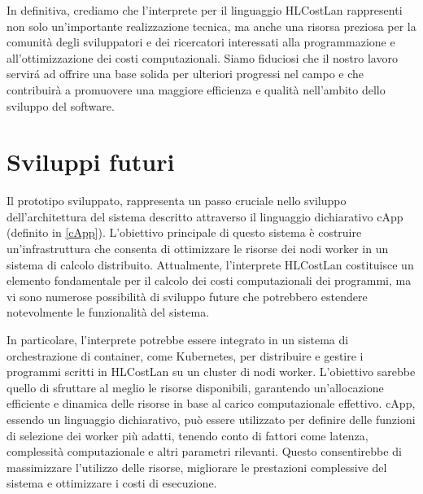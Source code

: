 \documentclass[../../main.tex]{subfiles}
\begin{document}
In definitiva, crediamo che l'interprete per il linguaggio HLCostLan rappresenti non solo un'importante realizzazione tecnica, ma anche una risorsa preziosa per la comunità degli sviluppatori e dei ricercatori interessati alla programmazione e all'ottimizzazione dei costi computazionali. Siamo fiduciosi che il nostro lavoro servirá ad offrire una base solida per ulteriori progressi nel campo e che contribuirà a promuovere una maggiore efficienza e qualità nell'ambito dello sviluppo del software.

\section{Sviluppi futuri}
Il prototipo sviluppato, rappresenta un passo cruciale nello sviluppo dell'architettura del sistema descritto attraverso il linguaggio dichiarativo cApp (definito in \ref{cApp}). L'obiettivo principale di questo sistema è costruire un'infrastruttura che consenta di ottimizzare le risorse dei nodi worker in un sistema di calcolo distribuito. Attualmente, l'interprete HLCostLan costituisce un elemento fondamentale per il calcolo dei costi computazionali dei programmi, ma vi sono numerose possibilità di sviluppo future che potrebbero estendere notevolmente le funzionalità del sistema.

In particolare, l'interprete potrebbe essere integrato in un sistema di orchestrazione di container, come Kubernetes, per distribuire e gestire i programmi scritti in HLCostLan su un cluster di nodi worker. L'obiettivo sarebbe quello di sfruttare al meglio le risorse disponibili, garantendo un'allocazione efficiente e dinamica delle risorse in base al carico computazionale effettivo. cApp, essendo un linguaggio dichiarativo, può essere utilizzato per definire delle funzioni di selezione dei worker più adatti, tenendo conto di fattori come latenza, complessità computazionale e altri parametri rilevanti. Questo consentirebbe di massimizzare l'utilizzo delle risorse, migliorare le prestazioni complessive del sistema e ottimizzare i costi di esecuzione.
\end{document}
